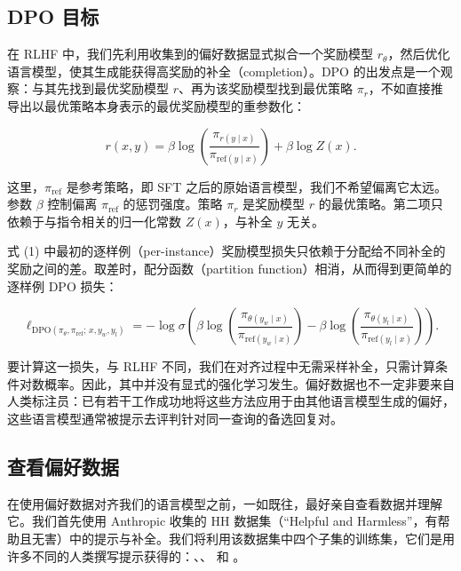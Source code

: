 \subsection{DPO 目标}

在 RLHF 中，我们先利用收集到的偏好数据显式拟合一个奖励模型 $r_\theta$，然后优化语言模型，使其生成能获得高奖励的补全（completion）。DPO 的出发点是一个观察：与其先找到最优奖励模型 $r$、再为该奖励模型找到最优策略 $\pi_r$，不如直接推导出以最优策略本身表示的最优奖励模型的重参数化：

\begin{equation}
r(x, y) = \beta \log\!\left( \frac{\pi_{r(y \mid x)}}{\pi_{\mathrm{ref}(y \mid x)}} \right) + \beta \log Z(x).
\end{equation}

这里，$\pi_{\mathrm{ref}}$ 是参考策略，即 SFT 之后的原始语言模型，我们不希望偏离它太远。参数 $\beta$ 控制偏离 $\pi_{\mathrm{ref}}$ 的惩罚强度。策略 $\pi_r$ 是奖励模型 $r$ 的最优策略。第二项只依赖于与指令相关的归一化常数 $Z(x)$，与补全 $y$ 无关。

式 (1) 中最初的逐样例（per-instance）奖励模型损失只依赖于分配给不同补全的奖励之间的差。取差时，配分函数（partition function）相消，从而得到更简单的逐样例 DPO 损失：

\begin{equation}
\ell_{\mathrm{DPO}(\pi_\theta, \pi_{\mathrm{ref}};\, x, y_w, y_l)} = -\log \sigma\!\left( \beta \log\!\left( \frac{\pi_{\theta(y_w \mid x)}}{\pi_{\mathrm{ref}(y_w \mid x)}} \right) - \beta \log\!\left( \frac{\pi_{\theta(y_l \mid x)}}{\pi_{\mathrm{ref}(y_l \mid x)}} \right) \right).
\end{equation}

要计算这一损失，与 RLHF 不同，我们在对齐过程中无需采样补全，只需计算条件对数概率。因此，其中并没有显式的强化学习发生。偏好数据也不一定非要来自人类标注员：已有若干工作成功地将这些方法应用于由其他语言模型生成的偏好，这些语言模型通常被提示去评判针对同一查询的备选回复对。

\subsection{查看偏好数据}

在使用偏好数据对齐我们的语言模型之前，一如既往，最好亲自查看数据并理解它。我们首先使用 Anthropic 收集的 HH 数据集（“Helpful and Harmless”，有帮助且无害）中的提示与补全。我们将利用该数据集中四个子集的训练集，它们是用许多不同的人类撰写提示获得的：、、 和 。

